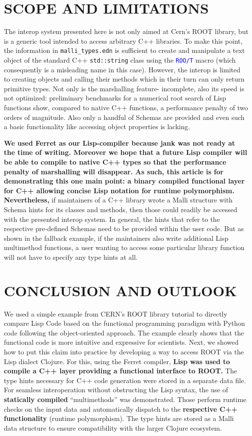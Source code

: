 \documentclass[twocolumn]{article}
\begin{document}
\section{SCOPE AND LIMITATIONS}
The interop system presented here is not only aimed at Cern’s ROOT library, but is a generic tool intended to access arbitrary C++ libraries. To make this point, the information in \texttt{malli\_types.edn} is sufficient to create and manipulate a text object of the standard C++ \texttt{std::string} class using the \texttt{\textcolor{blue}{ROO/T}} macro (which consequently is a misleading name in this case). However, the interop is limited to creating objects and calling their methods which in their turn can only return primitive types. Not only is the marshalling feature- incomplete, also its speed is not optimized: preliminary benchmarks for a numerical root search of Lisp functions show, compared to native C++ functions, a performance penalty of two orders of magnitude. Also only a handful of Schemas are provided and even such a basic functionality like accessing object properties is lacking.

\textbf{We used Ferret as our Lisp-compiler because jank was not ready at the time of writing. Moreover we hope that a future Lisp compiler will be able to compile to native C++ types so that the performance penalty of marshalling will disappear. As such, this article is for demonstrating this one main point: a binary compiled functional layer for C++ allowing concise Lisp notation for runtime polymorphism. Nevertheless,} if maintainers of a C++ library wrote a Malli structure with Schema hints for its classes and methods, then those could readily be accessed with the presented interop system. In general, the hints that refer to the respective pre-defined Schemas need to be provided within the user code. But as shown in the fallback example, if the maintainers also write additional Lisp multimethod functions, a user wanting to access some particular library function will not have to specify any type hints at all.

\section{CONCLUSION AND OUTLOOK}
We used a simple example from CERN's ROOT library tutorial to directly compare Lisp Code based on the functional programming paradigm with Python code following the object-oriented approach. The example clearly shows that the functional code is more intuitive and expressive for scientists. Next, we showed how to put this claim into practice by developing a way to access ROOT via the Lisp dialect Clojure. For this, using the Ferret compiler, \textbf{Lisp was used to  compile a C++ layer providing a functional interface to ROOT.} The type hints necessary for C++ code generation were stored in a separate data file. For seamless interoperation without obstructing the Lisp syntax, the use of\textbf{ statically compiled} “multimethods” was demonstrated. Those perform runtime checks on the input data and automatically dispatch to the \textbf{respective C++ functionality} (runtime polymorphism). The type hints are stored as a Malli data structure to ensure compatibility with the larger Clojure ecosystem.
\end{document}
